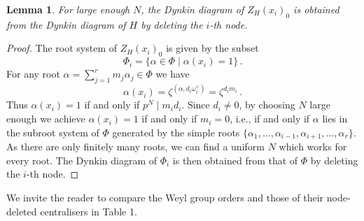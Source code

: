 \documentclass[oneside, 12pt, a4paper]{amsart}
\numberwithin{equation}{section}
\theoremstyle{plain}
\newtheorem{lemma}[theorem]{Lemma}
\theoremstyle{definition}
\theoremstyle{remark}
\begin{document}
\begin{lemma} \label{lem:killnode}
For large enough $N$, the Dynkin diagram of $Z_H(x_i)_0$ is obtained from the Dynkin diagram of $H$ by deleting the $i$-th node.
\end{lemma}
\begin{proof}
The root system of $Z_H(x_i)_0$ is given by the subset
\[
\Phi_i=\{\alpha\in \Phi\mid \alpha(x_i)=1\}\,.
\]
For any root $\alpha=\sum_{j=1}^r m_j \alpha_j\in \Phi$ we have
\[
\alpha(x_i)=\zeta^{(\alpha,d_i\omega_i^\vee)}=\zeta^{d_i m_i}\, .
\]
Thus $\alpha(x_i)=1$ if and only if $p^N \mid m_i d_i$. Since $d_i\neq 0$, by choosing $N$ large enough we achieve $\alpha(x_i)=1$ if and only if $m_i=0$, i.e., if and only if $\alpha$ lies in the subroot system of $\Phi$ generated by the simple roots $\{\alpha_1,\dots,\alpha_{i-1},\alpha_{i+1},\dots,\alpha_r\}$. As there are only finitely many roots, we can find a uniform $N$ which works for every root. The Dynkin diagram of $\Phi_i$ is then obtained from that of $\Phi$ by deleting the $i$-th node.
\end{proof}
We invite the reader to compare the Weyl group orders and those of their node-deleted centralisers in Table 1.
\end{document}
